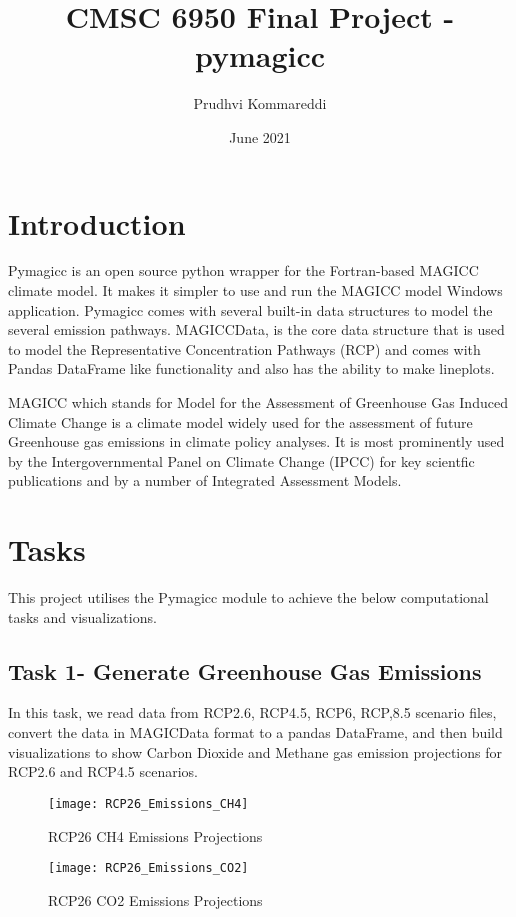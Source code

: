 \documentclass{article}
\title{CMSC 6950 Final Project - pymagicc}
\author{Prudhvi Kommareddi}
\date{June 2021}
\begin{document}
\maketitle

\section{Introduction}
Pymagicc\cite{Gieseke2018} is an open source python wrapper for the Fortran-based MAGICC climate model.
It makes it simpler to use and run the MAGICC model Windows application. Pymagicc comes with several
built-in data structures to model the several emission pathways. MAGICCData, is the core data structure
that is used to model the Representative Concentration Pathways (RCP) and comes with Pandas DataFrame like
functionality and also has the ability to make lineplots.

MAGICC which stands for Model for the Assessment of Greenhouse Gas Induced Climate Change is a
climate model widely used for the assessment of future Greenhouse gas emissions in climate policy analyses.
It is most prominently used by the Intergovernmental Panel on Climate Change (IPCC) for key scientfic
publications and by a number of Integrated Assessment Models.


\section{Tasks}
This project utilises the Pymagicc module to achieve the below computational tasks and visualizations.

\subsection{Task 1- Generate Greenhouse Gas Emissions}
In this task, we read data from RCP2.6, RCP4.5, RCP6, RCP,8.5 scenario files, convert the data in MAGICData format to a pandas DataFrame, and then build visualizations to show Carbon Dioxide and Methane gas emission projections for RCP2.6 and RCP4.5 scenarios. 
\begin{figure}[ht]
    \texttt{[image: RCP26\_Emissions\_CH4]}
    \caption{RCP26 CH4 Emissions Projections}
\end{figure}

\begin{figure}
    \texttt{[image: RCP26\_Emissions\_CO2]}
    \caption{RCP26 CO2 Emissions Projections}
\end{figure}
\end{document}
